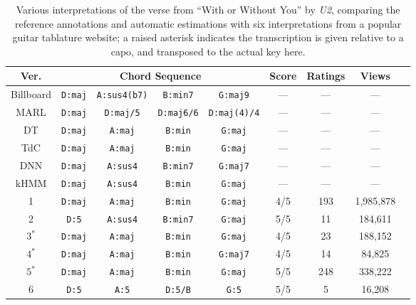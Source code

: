 \documentclass{article}
\begin{document}
\begin{table}[!t]
\small
\centering
\begin{tabular}{ c || c c c c | c c c c |}
Ver. & \multicolumn{4}{c}{Chord Sequence} & Score & Ratings & Views \\
 \hline
 Billboard & \texttt{D:maj} & \texttt{A:sus4(b7)} & \texttt{B:min7} & \texttt{G:maj9} & --- & --- & --- \\
 MARL & \texttt{D:maj} & \texttt{D:maj/5} & \texttt{D:maj6/6} & \texttt{D:maj(4)/4} & --- & --- & --- \\
 DT & \texttt{D:maj} & \texttt{A:maj} & \texttt{B:min} & \texttt{G:maj} & --- & --- & --- \\
 TdC & \texttt{D:maj} & \texttt{A:maj} & \texttt{B:min} & \texttt{G:maj} & --- & --- & --- \\
DNN & \texttt{D:maj} & \texttt{A:sus4} & \texttt{B:min7} & \texttt{G:maj7} & --- & --- & --- \\
kHMM & \texttt{D:maj} & \texttt{A:sus4} & \texttt{B:min} & \texttt{G:maj} & --- & --- & --- \\
1 & \texttt{D:maj} & \texttt{A:maj} & \texttt{B:min} & \texttt{G:maj} & 4/5 & 193 & 1,985,878 \\
2 & \texttt{D:5} & \texttt{A:sus4} & \texttt{B:min7} & \texttt{G:maj} & 5/5 & 11 & 184,611 \\
$3^*$ & \texttt{D:maj} & \texttt{A:maj} & \texttt{B:min} & \texttt{G:maj} & 4/5 & 23 & 188,152 \\
$4^*$ & \texttt{D:maj} & \texttt{A:maj} & \texttt{B:min} & \texttt{G:maj7} & 4/5 & 14 & 84,825 \\
$5^*$ & \texttt{D:maj} & \texttt{A:maj} & \texttt{B:min} & \texttt{G:maj} & 5/5 & 248 & 338,222 \\
6 & \texttt{D:5} & \texttt{A:5} & \texttt{D:5/B} & \texttt{G:5} & 5/5 & 5 & 16,208 \\
\hline
\end{tabular}
\caption{Various interpretations of the verse from ``With or Without You'' by \emph{U2}, comparing the reference annotations and automatic estimations with six interpretations from a popular guitar tablature website; a raised asterisk indicates the transcription is given relative to a capo, and transposed to the actual key here.}
\label{tab:wowu_chords}
\end{table}
\end{document}
